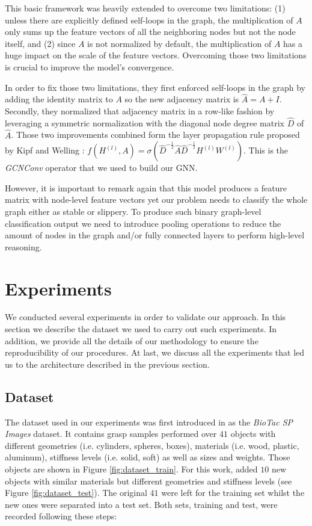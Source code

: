 This basic framework was heavily extended to overcome two limitations: (1) unless there are explicitly defined self-loops in the graph, the multiplication of $A$ only sums up the feature vectors of all the neighboring nodes but not the node itself, and (2) since $A$ is not normalized by default, the multiplication of $A$ has a huge impact on the scale of the feature vectors. Overcoming those two limitations is crucial to improve the model's convergence.

In order to fix those two limitations, they first enforced self-loops in the graph by adding the identity matrix to $A$ so the new adjacency matrix is $\hat{A} = A + I$. Secondly, they normalized that adjacency matrix in a row-like fashion by leveraging a symmetric normalization with the diagonal node degree matrix $\hat{D}$ of $\hat{A}$. Those two improvements combined form the layer propagation rule proposed by Kipf and Welling \cite{Kipf2016}: $f(H^{(l)}, A) = \sigma(\hat{D}^{-\frac{1}{2}}\hat{A}\hat{D}^{-\frac{1}{2}}H^{(l)}W^{(l)})$. This is the \emph{GCNConv} operator that we used to build our \ac{GNN}.

However, it is important to remark again that this model produces a feature matrix with node-level feature vectors yet our problem needs to classify the whole graph either as stable or slippery. To produce such binary graph-level classification output we need to introduce pooling operations to reduce the amount of nodes in the graph and/or fully connected layers to perform high-level reasoning.

\section{Experiments}
\label{cha:tactile:sec:experiments}

We conducted several experiments in order to validate our approach. In this section we describe the dataset we used to carry out such experiments. In addition, we provide all the details of our methodology to ensure the reproducibility of our procedures. At last, we discuss all the experiments that led us to the architecture described in the previous section.

\subsection{Dataset}
\label{cha:tactile:sec:experiments:subsec:dataset}

The dataset used in our experiments was first introduced in \cite{Zapata2018} as the \emph{BioTac SP Images} dataset. It contains grasp samples performed over $41$ objects with different geometries (i.e. cylinders, spheres, boxes), materials (i.e. wood, plastic, aluminum), stiffness levels (i.e. solid, soft) as well as sizes and weights. Those objects are shown in Figure \ref{fig:dataset_train}. For this work, added $10$ new objects with similar materials but different geometries and stiffness levels (see Figure \ref{fig:dataset_test}). The original $41$ were left for the training set whilst the new ones were separated into a test set. Both sets, training and test, were recorded following these steps:

